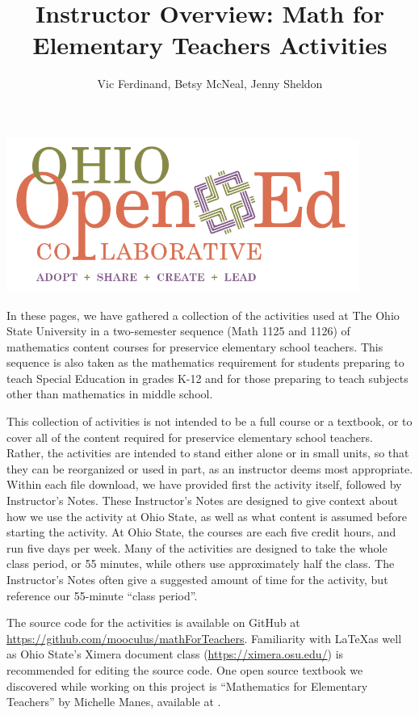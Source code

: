 \documentclass[nooutcomes]{ximera}
\title{Instructor Overview: Math for Elementary Teachers Activities}
\author{Vic Ferdinand, Betsy McNeal, Jenny Sheldon}
\begin{document}
\begin{abstract}

\end{abstract}\maketitle

\includegraphics[height=2in]{OOECLogo.png}

In these pages, we have gathered a collection of the activities used at The Ohio State University in a 
two-semester sequence (Math 1125 and 1126) of mathematics content courses for preservice elementary 
school teachers.  This sequence is also taken as the mathematics requirement for students preparing 
to teach Special Education in grades K-12 and for those preparing to teach subjects other than 
mathematics in middle school.

This collection of activities is not intended to be a full course or a textbook, or to cover all of the 
content required for preservice elementary school teachers.  Rather, the activities are intended to 
stand either alone or in small units, so that they can be reorganized or used in part, as an 
instructor deems most appropriate.  Within each file download, we have provided first the activity 
itself, followed by Instructor's Notes.  These Instructor's Notes are designed to give context about 
how we use the activity at Ohio State, as well as what content is assumed before starting the 
activity. At Ohio State, the courses are each five credit 
hours, and run five days per week.  Many of the activities are designed to take the whole class 
period, or 55 minutes, while others use approximately half the class.  
The Instructor's Notes often give a suggested amount of time for the 
activity, but reference our 55-minute ``class period''.

The source code for the activities is available on GitHub at 
\url{https://github.com/mooculus/mathForTeachers}.  Familiarity with \LaTeX as well as Ohio State's
Ximera document class (\url{https://ximera.osu.edu/}) is recommended for editing the source code.
One open source textbook we discovered while working on this project is ``Mathematics for Elementary 
Teachers'' by Michelle Manes, available at 
.
\end{document}
